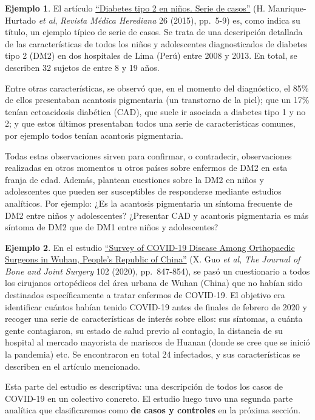 \documentclass[
]{book}
\theoremstyle{definition}
\theoremstyle{definition}
\newtheorem{example}{Ejemplo}[chapter]
\theoremstyle{definition}
\theoremstyle{definition}
\theoremstyle{remark}
\begin{document}
\begin{example}
\protect\hypertarget{exm:diabetesSC}{}\label{exm:diabetesSC}El artículo \href{http://www.scielo.org.pe/pdf/rmh/v26n1/a02v26n1.pdf}{``Diabetes tipo 2 en niños. Serie de casos''} (H. Manrique-Hurtado \emph{et al}, \emph{Revista Médica Herediana} 26 (2015), pp.~5-9) es, como indica su título, un ejemplo típico de serie de casos. Se trata de una descripción detallada de las características de todos los niños y adolescentes diagnosticados de diabetes tipo 2 (DM2) en dos hospitales de Lima (Perú) entre 2008 y 2013. En total, se describen 32 sujetos de entre 8 y 19 años.

Entre otras características, se observó que, en el momento del diagnóstico, el 85\% de ellos presentaban acantosis pigmentaria (un transtorno de la piel); que un 17\% tenían cetoacidosis diabética (CAD), que suele ir asociada a diabetes tipo 1 y no 2; y que estos últimos presentaban todos una serie de características comunes, por ejemplo todos tenían acantosis pigmentaria.

Todas estas observaciones sirven para confirmar, o contradecir, observaciones realizadas en otros momentos u otros países sobre enfermos de DM2 en esta franja de edad. Además, plantean cuestiones sobre la DM2 en niños y adolescentes que pueden ser susceptibles de responderse mediante estudios analíticos. Por ejemplo: ¿Es la acantosis pigmentaria un síntoma frecuente de DM2 entre niños y adolescentes? ¿Presentar CAD y acantosis pigmentaria es más síntoma de DM2 que de DM1 entre niños y adolescentes?
\end{example}

\begin{example}
\protect\hypertarget{exm:surveycovid}{}\label{exm:surveycovid}En el estudio \href{https://journals.lww.com/jbjsjournal/Fulltext/2020/05200/Survey_of_COVID_19_Disease_Among_Orthopaedic.1.aspx}{``Survey of COVID-19 Disease Among Orthopaedic Surgeons in Wuhan, People's Republic of China''} (X. Guo \emph{et al}, \emph{The Journal of Bone and Joint Surgery} 102 (2020), pp.~847-854), se pasó un cuestionario a todos los cirujanos ortopédicos del área urbana de Wuhan (China) que no habían sido destinados específicamente a tratar enfermos de COVID-19. El objetivo era identificar cuántos habían tenido COVID-19 antes de finales de febrero de 2020 y recoger una serie de características de interés sobre ellos: sus síntomas, a cuánta gente contagiaron, su estado de salud previo al contagio, la distancia de su hospital al mercado mayorista de mariscos de Huanan (donde se cree que se inició la pandemia) etc. Se encontraron en total 24 infectados, y sus características se describen en el artículo mencionado.

Esta parte del estudio es descriptiva: una descripción de todos los casos de COVID-19 en un colectivo concreto. El estudio luego tuvo una segunda parte analítica que clasificaremos como \textbf{de casos y controles} en la próxima sección.
\end{example}
\end{document}
